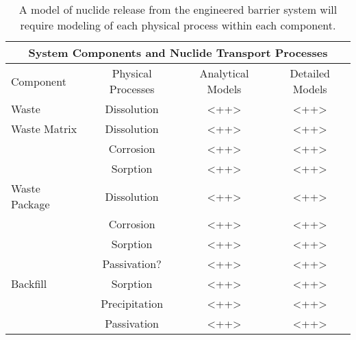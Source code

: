 %
\begin{table}
  \centering
  \footnotesize{
  \begin{tabular}{|l|c|c|c|}
    \multicolumn{4}{c}{\textbf{System Components and Nuclide Transport Processes}}\\
    \hline
    Component & Physical Processes & Analytical Models & Detailed Models\\ 
    \hline
    Waste        & Dissolution & <++> & <++> \\ 
    \hline
    Waste Matrix & Dissolution & <++> &<++> \\ 
                 & Corrosion   & <++> &<++> \\ 
                 & Sorption    & <++> &<++> \\ 
    \hline
    Waste Package & Dissolution    & <++> &<++> \\ 
                  & Corrosion      & <++> &<++> \\ 
                  & Sorption       & <++> &<++> \\ 
                  & Passivation?   & <++> &<++> \\ 
    \hline
    Backfill & Sorption            & <++> &<++> \\ 
             & Precipitation       & <++> &<++> \\ 
             & Passivation         & <++> &<++> \\ 
    \hline
  \end{tabular}
  \caption[Nuclide Transport Processes]{A model of nuclide release from the engineered barrier 
  system will require modeling of each physical process within each component.}
  \label{tab:processes}
  }
\end{table}


